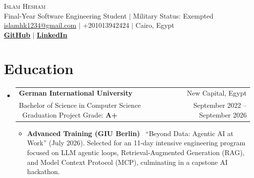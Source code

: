 \documentclass[letterpaper,11pt]{article}
\newcommand{\resumeItem}[1]{\item\small{#1}\vspace{-2pt}}
\newcommand{\resumeEducationSubheading}[4]{
\item
\begin{tabularx}{0.97\textwidth}[t]{>{\raggedright\arraybackslash}Xr}
\textbf{#1} & #2 \\
\small #3 & \small #4 \\
\end{tabularx}\vspace{-7pt}
}
\newcommand{\resumeSubHeadingListStart}[1][]{%
\begin{itemize}[leftmargin=0.15in, label={}, #1]%
}
\newcommand{\resumeSubHeadingListEnd}{\end{itemize}}
\newcommand{\headNameSize}{\Huge}
\newcommand{\headRoleSize}{\normalsize}
\newcommand{\headSpacingBefore}{0pt}
\newcommand{\headSpacingAfter}{10pt}
\newcommand{\eduBefore}{-35pt}
\newcommand{\eduAfter}{-6pt}
\newcommand{\expBefore}{-18pt}
\begin{document}
\vspace{\headSpacingBefore}
\begin{center}
{\headNameSize \scshape Islam Hesham} \\ \vspace{2pt}
{\headRoleSize Final-Year Software Engineering Student $|$ Military Status: Exempted} \\ \vspace{2pt}
\small
\href{mailto:islamhk1234@gmail.com}{islamhk1234@gmail.com} $|$
+201013942424 $|$ Cairo, Egypt \\ \vspace{2pt}
\textbf{\href{https://github.com/IslamHesham-Dev}{GitHub}} $|$
\textbf{\href{https://eg.linkedin.com/in/islam-hesham-34680a201?trk=people-guest_people_search-card$0}{LinkedIn}}
\end{center}
\vspace{\headSpacingAfter}

\vspace{\eduBefore}
\section{Education}
\vspace{\eduAfter}
\resumeSubHeadingListStart
\resumeEducationSubheading
{German International University}{New Capital, Egypt}
{Bachelor of Science in Computer Science \textbar\ Graduation Project Grade: \textbf{A+}}{September 2022 -- September 2026}
\par\vspace{2pt}
\begin{itemize}[leftmargin=0.3in, label=\raisebox{0.25ex}{\tiny$\bullet$}, topsep=0pt, itemsep=0pt]
\resumeItem{\textbf{Advanced Training (GIU Berlin)} \textbar\ ``Beyond Data: Agentic AI at Work'' (July 2026). Selected for an 11-day intensive engineering program focused on LLM agentic loops, Retrieval-Augmented Generation (RAG), and Model Context Protocol (MCP), culminating in a capstone AI hackathon.}
\end{itemize}\vspace{-5pt}
\vspace{-3pt}
\resumeSubHeadingListEnd

\vspace{\expBefore}
\end{document}
